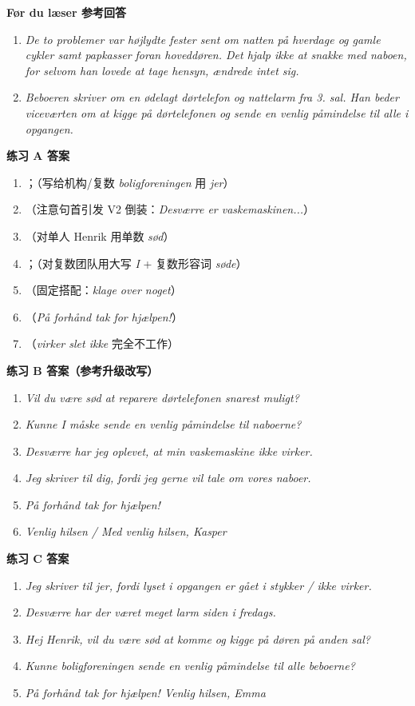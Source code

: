 \begin{answerbox}
\textbf{Før du læser 参考回答}
\begin{enumerate}
  \item \textit{De to problemer var højlydte fester sent om natten på hverdage og gamle cykler samt papkasser foran hoveddøren. Det hjalp ikke at snakke med naboen, for selvom han lovede at tage hensyn, ændrede intet sig.}
  \item \textit{Beboeren skriver om en ødelagt dørtelefon og nattelarm fra 3. sal. Han beder viceværten om at kigge på dørtelefonen og sende en venlig påmindelse til alle i opgangen.}
\end{enumerate}

\textbf{练习 A 答案}
\begin{enumerate}
  \item {}；（写给机构/复数 \textit{boligforeningen} 用 \textit{jer}）
  \item {}（注意句首引发 V2 倒装：\textit{Desværre er vaskemaskinen...}）
  \item {}（对单人 Henrik 用单数 \textit{sød}）
  \item {}；（对复数团队用大写 \textit{I} + 复数形容词 \textit{søde}）
  \item {}（固定搭配：\textit{klage over noget}）
  \item {}（\textit{På forhånd tak for hjælpen!}）
  \item {}（\textit{virker slet ikke} 完全不工作）
\end{enumerate}

\textbf{练习 B 答案（参考升级改写）}
\begin{enumerate}
  \item \textit{Vil du være sød at reparere dørtelefonen snarest muligt?}
  \item \textit{Kunne I måske sende en venlig påmindelse til naboerne?}
  \item \textit{Desværre har jeg oplevet, at min vaskemaskine ikke virker.}
  \item \textit{Jeg skriver til dig, fordi jeg gerne vil tale om vores naboer.}
  \item \textit{På forhånd tak for hjælpen!}
  \item \textit{Venlig hilsen / Med venlig hilsen, Kasper}
\end{enumerate}

\textbf{练习 C 答案}
\begin{enumerate}
  \item \textit{Jeg skriver til jer, fordi lyset i opgangen er gået i stykker / ikke virker.}
  \item \textit{Desværre har der været meget larm siden i fredags.}
  \item \textit{Hej Henrik, vil du være sød at komme og kigge på døren på anden sal?}
  \item \textit{Kunne boligforeningen sende en venlig påmindelse til alle beboerne?}
  \item \textit{På forhånd tak for hjælpen! Venlig hilsen, Emma}
\end{enumerate}


\end{answerbox}
